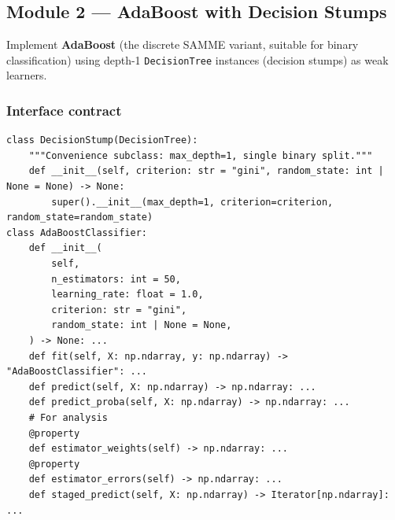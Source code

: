 \documentclass[11pt,a4paper]{article}
\begin{document}
\subsection{Module 2 --- AdaBoost with Decision Stumps}
Implement \textbf{AdaBoost} (the discrete SAMME variant, suitable for binary classification) using depth-1 \texttt{DecisionTree} instances (decision stumps) as weak learners.
\subsubsection{Interface contract}
\begin{lstlisting}[style=python]
class DecisionStump(DecisionTree):
    """Convenience subclass: max_depth=1, single binary split."""
    def __init__(self, criterion: str = "gini", random_state: int | None = None) -> None:
        super().__init__(max_depth=1, criterion=criterion, random_state=random_state)
class AdaBoostClassifier:
    def __init__(
        self,
        n_estimators: int = 50,
        learning_rate: float = 1.0,
        criterion: str = "gini",
        random_state: int | None = None,
    ) -> None: ...
    def fit(self, X: np.ndarray, y: np.ndarray) -> "AdaBoostClassifier": ...
    def predict(self, X: np.ndarray) -> np.ndarray: ...
    def predict_proba(self, X: np.ndarray) -> np.ndarray: ...
    # For analysis
    @property
    def estimator_weights(self) -> np.ndarray: ...
    @property
    def estimator_errors(self) -> np.ndarray: ...
    def staged_predict(self, X: np.ndarray) -> Iterator[np.ndarray]: ...
\end{lstlisting}
\end{document}
